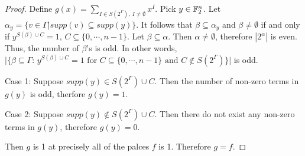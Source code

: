 \begin{proof}
  \par Define $g(x)=\sum_{I\in S(2^\Gamma),\ I\not=\emptyset}x^I$.
  Pick $y\in\mathbb{F}_2^n$. Let $\alpha_y=\{v\in\Gamma|
  supp(v)\subseteq supp(y)\}$. It follows that $\beta\subseteq\alpha_y$ and
  $\beta\not=\emptyset$ if and only if $y^{S(\beta) \cup C}=1$,
  $C\subseteq\{0,\cdots,n-1\}$. Let $\beta\subseteq\alpha$. Then
  $\alpha\not=\emptyset$, therefore $|2^\alpha|$ is even. Thus, the number
  of $\beta$'s is odd. In other words,
  $\lvert\{\beta\subseteq\Gamma\text{: } y^{S(\beta)\cup C}=1
  \text{ for }C\subseteq\{0,\cdots,n-1\}\text{ and }
  C\not\in S(2^\Gamma)\}\rvert$ is odd.

  \par Case 1: Suppose $supp(y)\in S(2^\Gamma)\cup C$. Then the number of
  non-zero terms in $g(y)$ is odd, therfore $g(y)=1$.

  \par Case 2: Suppose $supp(y)\not\in S(2^\Gamma)\cup C$. Then there do not
  exist any non-zero terms in $g(y)$, therefore $g(y)=0$.

  \par Then $g$ is 1 at precisely all of the palces $f$ is 1. Therefore
  $g=f$.
\end{proof}


